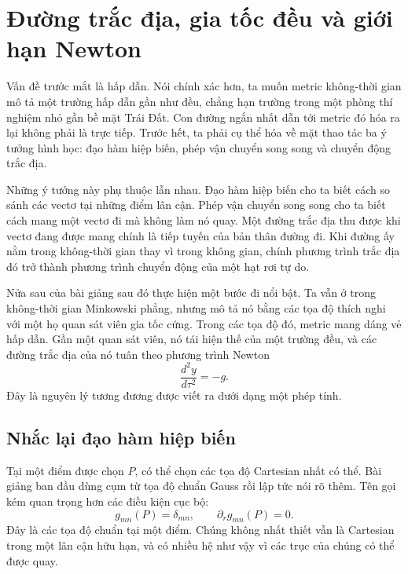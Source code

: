 \chapter{Đường trắc địa, gia tốc đều và giới hạn Newton}

Vấn đề trước mắt là hấp dẫn. Nói chính xác hơn, ta muốn metric không-thời gian mô tả một trường hấp dẫn gần như đều, chẳng hạn trường trong một phòng thí nghiệm nhỏ gần bề mặt Trái Đất. Con đường ngắn nhất dẫn tới metric đó hóa ra lại không phải là trực tiếp. Trước hết, ta phải cụ thể hóa về mặt thao tác ba ý tưởng hình học: đạo hàm hiệp biến, phép vận chuyển song song và chuyển động trắc địa.

Những ý tưởng này phụ thuộc lẫn nhau. Đạo hàm hiệp biến cho ta biết cách so sánh các vectơ tại những điểm lân cận. Phép vận chuyển song song cho ta biết cách mang một vectơ đi mà không làm nó quay. Một đường trắc địa thu được khi vectơ đang được mang chính là tiếp tuyến của bản thân đường đi. Khi đường ấy nằm trong không-thời gian thay vì trong không gian, chính phương trình trắc địa đó trở thành phương trình chuyển động của một hạt rơi tự do.

Nửa sau của bài giảng sau đó thực hiện một bước đi nổi bật. Ta vẫn ở trong không-thời gian Minkowski phẳng, nhưng mô tả nó bằng các tọa độ thích nghi với một họ quan sát viên gia tốc cứng. Trong các tọa độ đó, metric mang dáng vẻ hấp dẫn. Gần một quan sát viên, nó tái hiện thế của một trường đều, và các đường trắc địa của nó tuân theo phương trình Newton
\begin{equation}
\frac{d^2y}{d\tau^2}=-g.
\end{equation}
Đây là nguyên lý tương đương được viết ra dưới dạng một phép tính.

\section{Nhắc lại đạo hàm hiệp biến}

Tại một điểm được chọn \(P\), có thể chọn các tọa độ Cartesian nhất có thể. Bài giảng ban đầu dùng cụm từ tọa độ chuẩn Gauss rồi lập tức nói rõ thêm. Tên gọi kém quan trọng hơn các điều kiện cục bộ:
\begin{equation}
g_{mn}(P)=\delta_{mn},
\qquad
\partial_r g_{mn}(P)=0.
\label{eq:l4-normal-point}
\end{equation}
Đây là các tọa độ chuẩn tại một điểm. Chúng không nhất thiết vẫn là Cartesian trong một lân cận hữu hạn, và có nhiều hệ như vậy vì các trục của chúng có thể được quay.

